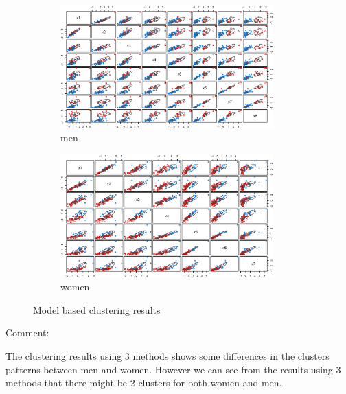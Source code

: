 \documentclass{article}
\begin{document}
\begin{itemize}[leftmargin = 0 em]
\begin{figure}[!htb]
          \begin{subfigure}[b]{\linewidth}
            \centering
            \includegraphics[width = 0.9\textwidth]{men_clust.eps}
            \caption{men}
          \end{subfigure}%

          \begin{subfigure}[b]{\linewidth}
            \centering
            \includegraphics[width = 0.9\textwidth]{women_mclust.eps}
            \caption{women}
          \end{subfigure}
          \caption{Model based clustering results}
          \label{mcl}
\end{figure}




	
 \end{itemize}

 \newpage

 \noindent Comment: 

 The clustering results using 3 methods shows some differences in the clusters patterns between men and women. However we can see from the results using 3 methods that there might be 2 clusters for both women and men. 









	
	
	
	
\end{document}
